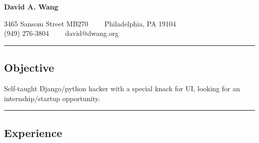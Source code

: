 \documentclass[10pt,letterpaper]{article}
\newenvironment{indentsection}[1]%
{\begin{list}{}%
	{\setlength{\leftmargin}{#1}}%
	\item[]%
}
{\end{list}}
\begin{document}
\begin{center}
{\LARGE \textbf{David A. Wang}}

3465 Sansom Street MB270\ \ \textbullet
\ \ Philadelphia, PA 19104
\\
(949) 276-3804\ \ \textbullet
\ \ david@dwang.org
\end{center}


\hrule
\vspace{-0.4em}
\subsection*{Objective}
\begin{indentsection}{\parindent}
\begin{description*}
	\item Self-taught Django/python hacker with a special knack for UI, looking for an internship/startup opportunity.
\end{description*}
\end{indentsection}

\hrule
\vspace{-0.4em}
\subsection*{Experience}
\end{document}

